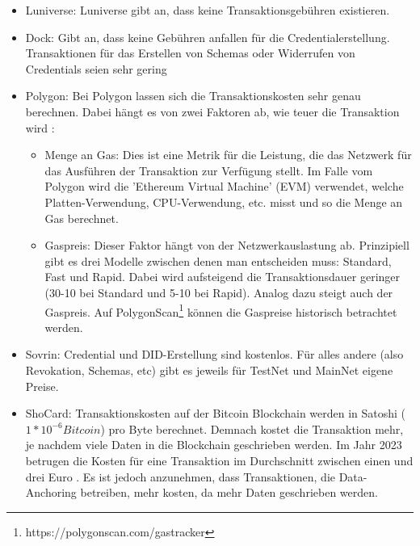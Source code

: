\begin{itemize}
	\item Luniverse: Luniverse gibt an, dass keine Transaktionsgebühren existieren.
	\item Dock: Gibt an, dass keine Gebühren anfallen für die Credentialerstellung. Transaktionen für das Erstellen von Schemas oder Widerrufen von Credentials seien sehr gering \cite{ID44}
	\item Polygon: Bei Polygon lassen sich die Transaktionskosten sehr genau berechnen. Dabei hängt es von zwei Faktoren ab, wie teuer die Transaktion wird \cite{ID45}:
	\begin{itemize}
		\item Menge an Gas: Dies ist eine Metrik für die Leistung, die das Netzwerk für das Ausführen der Transaktion zur Verfügung stellt. Im Falle vom Polygon wird die 'Ethereum Virtual Machine' (EVM) verwendet, welche Platten-Verwendung, CPU-Verwendung, etc. misst und so die Menge an Gas berechnet.
		\item Gaspreis: Dieser Faktor hängt von der Netzwerkauslastung ab. Prinzipiell gibt es drei Modelle zwischen denen man entscheiden muss: Standard, Fast und Rapid. Dabei wird aufsteigend die Transaktionsdauer geringer (30-10 bei Standard und 5-10 bei Rapid). Analog dazu steigt auch der Gaspreis. Auf PolygonScan\footnote{https://polygonscan.com/gastracker} können die Gaspreise historisch betrachtet werden.
	\end{itemize}
	\item Sovrin: Credential und DID-Erstellung sind kostenlos. Für alles andere (also Revokation, Schemas, etc) gibt es jeweils für TestNet und MainNet eigene Preise.
	\item ShoCard: Transaktionskosten auf der Bitcoin Blockchain werden in Satoshi ($1 * 10^{-6} Bitcoin$) pro Byte berechnet. Demnach kostet die Transaktion mehr, je nachdem viele Daten in die Blockchain geschrieben werden. Im Jahr 2023 betrugen die Kosten für eine Transaktion im Durchschnitt zwischen einen und drei Euro \cite{ID49}. Es ist jedoch anzunehmen, dass Transaktionen, die Data-Anchoring betreiben, mehr kosten, da mehr Daten geschrieben werden.
	
\end{itemize}

